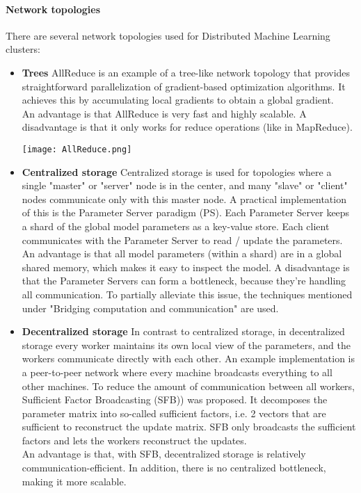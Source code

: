 \paragraph{Network topologies}
There are several network topologies used for Distributed Machine Learning clusters:
\begin{itemize}
	\item \textbf{Trees} AllReduce\cite{Agar14} is an example of a tree-like network topology that provides straightforward parallelization of gradient-based optimization algorithms. It achieves this by accumulating local gradients to obtain a global gradient.\\
	An advantage is that AllReduce is very fast and highly scalable. A disadvantage is that it only works for reduce operations (like in MapReduce).
	\begin{minipage}{\linewidth}
		\centering
		\texttt{[image: AllReduce.png]}
	\end{minipage}
	\item \textbf{Centralized storage} Centralized storage is used for topologies where a single "master" or "server" node is in the center, and many "slave" or "client" nodes communicate only with this master node. A practical implementation of this is the Parameter Server paradigm (PS). Each Parameter Server keeps a shard of the global model parameters as a key-value store. Each client communicates with the Parameter Server to read / update the parameters. \\
	An advantage is that all model parameters (within a shard) are in a global shared memory, which makes it easy to inspect the model. A disadvantage is that the Parameter Servers can form a bottleneck, because they're handling all communication. To partially alleviate this issue, the techniques mentioned under "Bridging computation and communication" are used.
	\item \textbf{Decentralized storage} In contrast to centralized storage, in decentralized storage every worker maintains its own local view of the parameters, and the workers communicate directly with each other. An example implementation is a peer-to-peer network where every machine broadcasts everything to all other machines. To reduce the amount of communication between all workers, Sufficient Factor Broadcasting (SFB)\cite{Li13}) was proposed. It decomposes the parameter matrix into so-called sufficient factors, i.e. 2 vectors that are sufficient to reconstruct the update matrix. SFB only broadcasts the sufficient factors and lets the workers reconstruct the updates.\\
	An advantage is that, with SFB, decentralized storage is relatively communication-efficient. In addition, there is no centralized bottleneck, making it more scalable.
\end{itemize}
